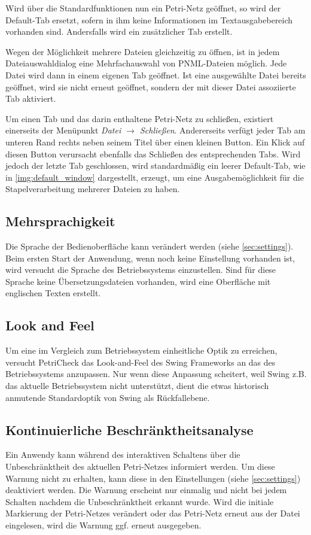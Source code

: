 Wird über die Standardfunktionen nun ein Petri-Netz geöffnet, so wird der
Default-Tab ersetzt, sofern in ihm keine Informationen im Textausgabebereich
vorhanden sind. Andersfalls wird ein zusätzlicher Tab erstellt.

Wegen der Möglichkeit mehrere Dateien gleichzeitig zu öffnen, ist in jedem
Dateiauswahldialog eine Mehrfachauswahl von PNML-Dateien möglich. Jede Datei
wird dann in einem eigenen Tab geöffnet. Ist eine ausgewählte Datei bereits
geöffnet, wird sie nicht erneut geöffnet, sondern der mit dieser Datei
assoziierte Tab aktiviert.

Um einen Tab und das darin enthaltene Petri-Netz zu schließen, existiert
einerseits der Menüpunkt \emph{Datei $\rightarrow$ Schließen}. Andererseits
verfügt jeder Tab am unteren Rand rechts neben seinem Titel über einen kleinen
Button. Ein Klick auf diesen Button verursacht ebenfalls das Schließen des
entsprechenden Tabs. Wird jedoch der letzte Tab geschlossen, wird standardmäßig
ein leerer Default-Tab, wie in \cref{img:default_window} dargestellt, erzeugt,
um eine Ausgabemöglichkeit für die Stapelverarbeitung mehrerer Dateien zu haben.

\subsection{Mehrsprachigkeit}
Die Sprache der Bedienoberfläche kann verändert werden (siehe
\cref{sec:settings}). Beim ersten Start der Anwendung, wenn noch keine
Einstellung vorhanden ist, wird versucht die Sprache des Betriebssystems
einzustellen. Sind für diese Sprache keine Übersetzungsdateien vorhanden, wird
eine Oberfläche mit englischen Texten erstellt.

\subsection{Look and Feel}
Um eine im Vergleich zum Betriebssystem einheitliche Optik zu erreichen,
versucht PetriCheck das Look-and-Feel des Swing Frameworks an das des
Betriebssystems anzupassen. Nur wenn diese Anpassung scheitert, weil Swing z.B.
das aktuelle Betriebssystem nicht unterstützt, dient die etwas historisch
anmutende Standardoptik von Swing als Rück\-fall\-ebene.

\subsection{Kontinuierliche Beschränktheitsanalyse}
Ein Anwendy kann während des interaktiven Schaltens über die Unbeschränktheit
des aktuellen Petri-Netzes informiert werden. Um diese Warnung nicht zu
erhalten, kann diese in den Einstellungen (siehe \cref{sec:settings})
deaktiviert werden. Die Warnung erscheint nur einmalig und nicht bei jedem
Schalten nachdem die Unbeschränktheit erkannt wurde. Wird die initiale
Markierung der Petri-Netzes verändert oder das Petri-Netz erneut aus der Datei
eingelesen, wird die Warnung ggf. erneut ausgegeben.

